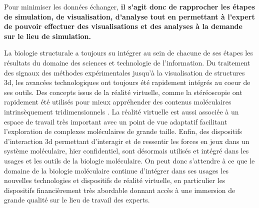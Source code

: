 Pour minimiser les données échanger, \textbf{il s'agit donc de rapprocher les étapes de simulation, de visualisation, d'analyse tout en permettant à l'expert de pouvoir effectuer des visualisations et des analyses à la demande sur le lieu de simulation.}





La biologie structurale a toujours su intégrer au sein de chacune de ses étapes les résultats du domaine des sciences et technologie de l'information. Du traitement des signaux des méthodes expérimentales jusqu'à la visualisation de structures 3d, les avancées technologiques ont toujours été rapidement intégrés au coeur de ses outils. Des concepts issus de la réalité virtuelle, comme la stéréoscopie ont rapidement été utilisés pour mieux appréhender des contenus moléculaires intrinsèquement tridimensionnels \cite{van2000immersive,stone_immersive_2010,odonoghue_visualization_2010}. La réalité virtuelle est aussi associée à un espace de travail très important avec un point de vue adaptatif facilitant l'exploration de complexes moléculaires de grande taille. Enfin, des dispositifs d'interaction 3d permettant d'interagir et de ressentir les forces en jeux dans un système moléculaire, hier confidentiel, sont désormais utilisés et intégré dans les usages et les outils de la biologie moléculaire. On peut donc s'attendre à ce que le domaine de la biologie moléculaire continue d'intégrer dans ses usages les nouvelles technologies et dispositifs de réalité virtuelle, en particulier les dispositifs financièrement très abordable donnant accès à une immersion de grande qualité sur le lieu de travail des experts.

